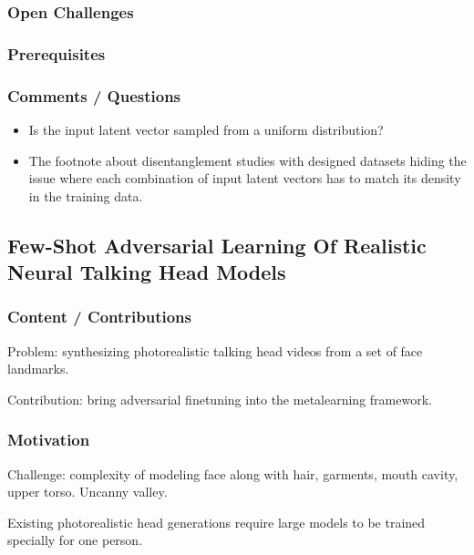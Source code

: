 \documentclass[a4paper, 12pt]{article}
\begin{document}
\subsubsection{Open Challenges}


\subsubsection{Prerequisites}


\subsubsection{Comments / Questions}

\begin{itemize}
        \item Is the input latent vector sampled from a uniform distribution?

        \item The footnote about disentanglement studies with designed datasets
                hiding the issue where each combination of input latent vectors
                has to match its density in the training data.
\end{itemize}



\subsection{Few-Shot Adversarial Learning Of Realistic Neural Talking Head
            Models~\cite{zakharov2019fewshot}}

\subsubsection{Content / Contributions}

Problem: synthesizing photorealistic talking head videos from a set of face
landmarks.

Contribution: bring adversarial finetuning into the metalearning framework.


\subsubsection{Motivation}

Challenge: complexity of modeling face along with hair, garments, mouth
cavity, upper torso.
Uncanny valley.

Existing photorealistic head generations require large models to be trained
specially for one person.
\end{document}
